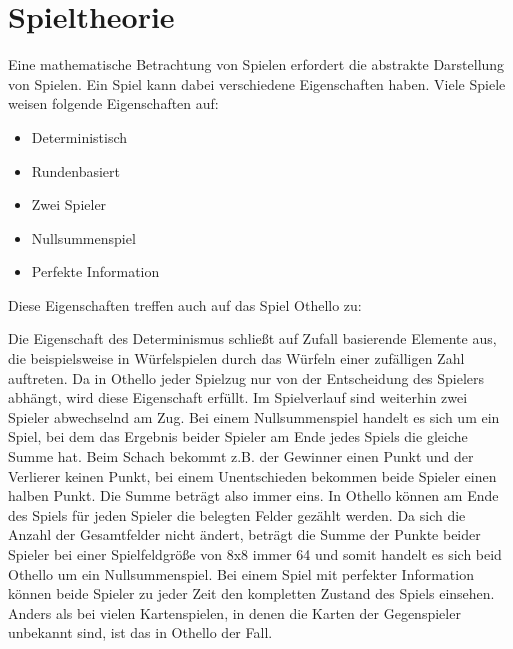 \section{Spieltheorie}

Eine mathematische Betrachtung von Spielen erfordert die abstrakte Darstellung von Spielen.
Ein Spiel kann dabei verschiedene Eigenschaften haben. Viele Spiele weisen folgende Eigenschaften auf:

\begin{itemize}
    \item Deterministisch
    \item Rundenbasiert
    \item Zwei Spieler
    \item Nullsummenspiel
    \item Perfekte Information
\end{itemize}

Diese Eigenschaften treffen auch auf das Spiel Othello zu:

Die Eigenschaft des Determinismus schließt auf Zufall basierende Elemente aus, die beispielsweise in Würfelspielen durch das Würfeln einer zufälligen Zahl auftreten.
Da in Othello jeder Spielzug nur von der Entscheidung des Spielers abhängt, wird diese Eigenschaft erfüllt.
Im Spielverlauf sind weiterhin zwei Spieler abwechselnd am Zug.
Bei einem Nullsummenspiel handelt es sich um ein Spiel, bei dem das Ergebnis beider Spieler am Ende jedes Spiels die gleiche Summe hat.
Beim Schach bekommt z.B. der Gewinner einen Punkt und der Verlierer keinen Punkt, bei einem Unentschieden bekommen beide Spieler einen halben Punkt.
Die Summe beträgt also immer eins.
In Othello können am Ende des Spiels für jeden Spieler die belegten Felder gezählt werden.
Da sich die Anzahl der Gesamtfelder nicht ändert, beträgt die Summe der Punkte beider Spieler bei einer Spielfeldgröße von 8x8 immer 64 und somit handelt es sich beid Othello um ein Nullsummenspiel.
Bei einem Spiel mit perfekter Information können beide Spieler zu jeder Zeit den kompletten Zustand des Spiels einsehen.
Anders als bei vielen Kartenspielen, in denen die Karten der Gegenspieler unbekannt sind, ist das in Othello der Fall.
\cite[S.~161f.]{ai2010russel}
